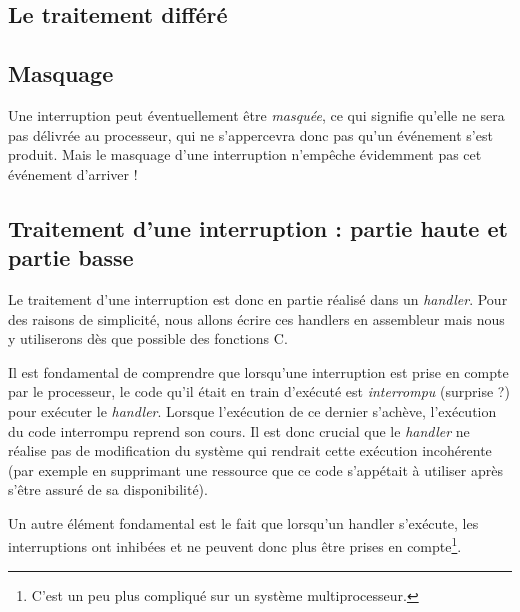 \subsection{Le traitement différé}

%
\subsection{Masquage}

   Une interruption peut éventuellement être  {\em masquée}, ce qui
signifie qu'elle ne sera pas délivrée au processeur, qui ne
s'appercevra donc pas qu'un événement s'est produit. Mais le masquage
d'une interruption n'empêche évidemment pas cet événement d'arriver !

%
\subsection{Traitement d'une interruption : partie haute et partie basse}

    Le traitement d'une interruption est donc en partie réalisé dans
un {\em handler}. Pour des raisons de simplicité, nous allons écrire
ces handlers en assembleur mais nous y utiliserons dès que possible
des fonctions C.

   Il est fondamental de comprendre que lorsqu'une interruption est
prise en compte par le processeur, le code qu'il était en train
d'exécuté est {\em interrompu} (surprise ?) pour exécuter le {\em
  handler}. Lorsque l'exécution de ce dernier s'achève, l'exécution du
code interrompu reprend son cours. Il est donc crucial que le {\em
  handler} ne réalise pas de modification du système qui rendrait
cette exécution incohérente (par exemple en supprimant une ressource
que ce code s'appétait à utiliser après s'être assuré de sa
disponibilité).

   Un autre élément fondamental est le fait que lorsqu'un handler
s'exécute, les interruptions ont inhibées et ne peuvent donc plus être
prises en compte\footnote{C'est un peu plus compliqué sur un système
  multiprocesseur.}. 

%      
